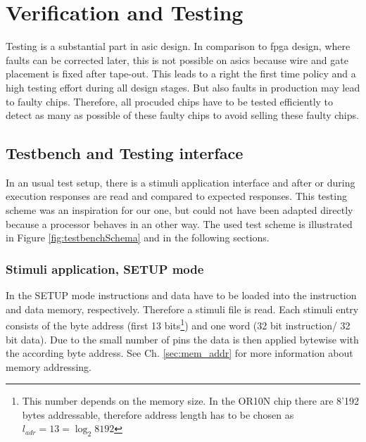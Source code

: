


\chapter{Verification and Testing}
Testing is a substantial part in \gls{asic} design. In comparison to \gls{fpga} design, where faults can be corrected later, this is not possible on \glspl{asic} because wire and gate placement is fixed after tape-out. This leads to a right the first time policy and a high testing effort during all design stages. 
But also faults in production may lead to faulty chips. Therefore, all procuded chips have to be tested efficiently to detect as many as possible of these faulty chips to avoid selling these faulty chips. \cite{vlsi3}

\section{Testbench and Testing interface}
In an usual test setup, there is a stimuli application interface and after or during execution responses are read and compared to expected responses. \cite{vlsi1} This testing scheme was an inspiration for our one, but could not have been adapted directly because a processor behaves in an other way. The used test scheme is illustrated in Figure \ref{fig:testbenchSchema} and in the following sections.

\subsection{Stimuli application, SETUP mode}
In the SETUP mode instructions and data have to be loaded into the instruction and data memory, respectively. Therefore a stimuli file is read. Each stimuli entry consists of the byte address (first 13 bits\footnote{This number depends on the memory size. In the OR10N chip there are 8'192 bytes addressable, therefore address length has to be chosen as $l_{adr}=13=\log_2 8192$}) and one word (32 bit instruction/ 32 bit data). Due to the small number of pins the data is then applied bytewise with the according byte address. See Ch. \ref{sec:mem_addr} for more information about memory addressing.

